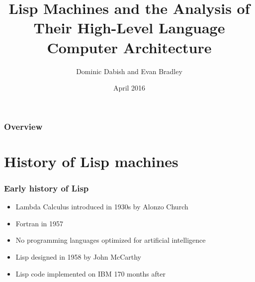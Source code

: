 \documentclass{beamer}
\title[Lisp machines]{Lisp Machines and the Analysis of Their High-Level Language Computer Architecture} %
\author{Dominic Dabish and Evan Bradley} %
\institute[OU] %
{
Oakland University \\ %
\medskip
\textit{\{dadabish, edbradley\}@oakland.edu} %
}
\date{April 2016} %
\begin{document}
\begin{frame}
	\frametitle{\space}
	\titlepage %
\end{frame}

\begin{frame}
\frametitle{Overview} %
\tableofcontents %
\end{frame}


\section{History of Lisp machines} %



\begin{frame}
	\frametitle{Early history of Lisp}
	\begin{itemize}
		\item Lambda Calculus introduced in 1930s by Alonzo Church
		\newline
		\item Fortran in 1957
		\newline
		\item No programming languages optimized for artificial intelligence
		\newline
		\item Lisp designed in 1958 by John McCarthy
		\newline
		\item Lisp code implemented on IBM 170 months after
		\newline
	\end{itemize}
\end{frame}
\end{document}
